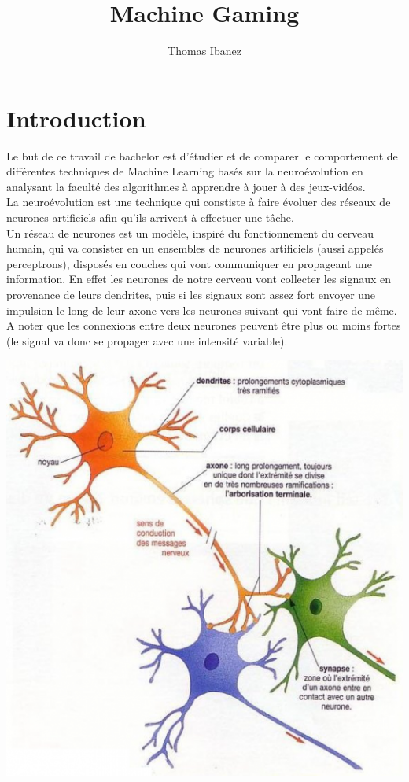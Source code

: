\documentclass{article}
\title{Machine Gaming}
\author{Thomas Ibanez}
\begin{document}
\tableofcontents

\newpage

\section{Introduction}

Le but de ce travail de bachelor est d'étudier et de comparer le comportement de différentes techniques de Machine Learning basés sur la neuroévolution en analysant la faculté des algorithmes à apprendre à jouer à des jeux-vidéos.\\

La neuroévolution est une technique qui constiste à faire évoluer des réseaux de neurones artificiels afin qu'ils arrivent à effectuer une tâche.\\

Un réseau de neurones est un modèle, inspiré du fonctionnement du cerveau humain, qui va consister en un ensembles de neurones artificiels (aussi appelés perceptrons), disposés en couches qui vont communiquer en propageant une information. En effet les neurones de notre cerveau vont collecter les signaux en provenance de leurs dendrites, puis si les signaux sont assez fort envoyer une impulsion le long de leur axone vers les neurones suivant qui vont faire de même. A noter que les connexions entre deux neurones peuvent être plus ou moins fortes (le signal va donc se propager avec une intensité variable).
\begin{center}
\includegraphics[scale=0.5]{neurones.png}
\end{center}
\end{document}
